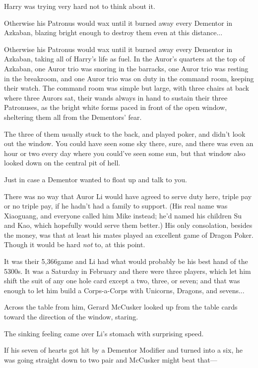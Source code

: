 Harry was trying very hard not to think about it.

Otherwise his Patronus would wax until it burned away every Dementor in Azkaban, blazing bright enough to destroy them even at this distance...

Otherwise his Patronus would wax until it burned away every Dementor in Azkaban, taking all of Harry’s life as fuel.
\sbreak
In the Auror’s quarters at the top of Azkaban, one Auror trio was snoring in the barracks, one Auror trio was resting in the breakroom, and one Auror trio was on duty in the command room, keeping their watch. The command room was simple but large, with three chairs at back where three Aurors sat, their wands always in hand to sustain their three Patronuses, as the bright white forms paced in front of the open window, sheltering them all from the Dementors’ fear.

The three of them usually stuck to the back, and played poker, and didn’t look out the window. You could have seen some sky there, sure, and there was even an hour or two every day where you could’ve seen some sun, but that window also looked down on the central pit of hell.

Just in case a Dementor wanted to float up and talk to you.

There was no way that Auror Li would have agreed to serve duty here, triple pay or no triple pay, if he hadn’t had a family to support. (His real name was Xiaoguang, and everyone called him Mike instead; he’d named his children Su and Kao, which hopefully would serve them better.) His only consolation, besides the money, was that at least his mates played an excellent game of Dragon Poker. Though it would be hard \emph{not} to, at this point.

It was their 5,366\Th game and Li had what would probably be his best hand of the 5300s. It was a Saturday in February and there were three players, which let him shift the suit of any one hole card except a two, three, or seven; and that was enough to let him build a Corps-a-Corps with Unicorns, Dragons, and sevens...

Across the table from him, Gerard McCusker looked up from the table cards toward the direction of the window, staring.

The sinking feeling came over Li’s stomach with surprising speed.

If his seven of hearts got hit by a Dementor Modifier and turned into a six, he was going straight down to two pair and McCusker might beat that—

